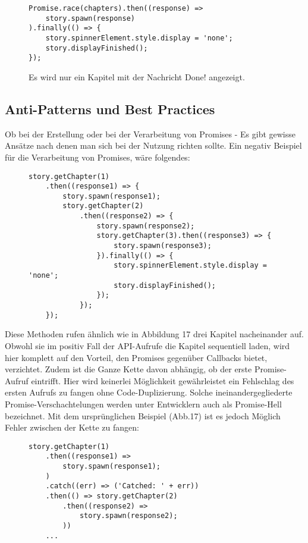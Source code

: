 \begin{figure}[H]
\begin{lstlisting}[basicstyle=\small]
Promise.race(chapters).then((response) =>
    story.spawn(response)
).finally(() => {
    story.spinnerElement.style.display = 'none';
    story.displayFinished();
});
\end{lstlisting}
\caption{Es wird nur ein Kapitel mit der Nachricht \glqq Done!\grqq{} angezeigt.}
\end{figure}

\subsection{Anti-Patterns und Best Practices}

Ob bei der Erstellung oder bei der Verarbeitung von Promises - Es gibt gewisse Ansätze nach denen man sich bei der Nutzung richten sollte. Ein negativ Beispiel für die Verarbeitung von Promises, wäre folgendes:

\begin{figure}[H]
\begin{lstlisting}[basicstyle=\small]
story.getChapter(1)
    .then((response1) => {
        story.spawn(response1);
        story.getChapter(2)
            .then((response2) => {
                story.spawn(response2);
                story.getChapter(3).then((response3) => {
                    story.spawn(response3);
                }).finally(() => {
                    story.spinnerElement.style.display = 'none';
                    story.displayFinished();
                });
            });
    });
\end{lstlisting}
\end{figure}

\noindent
Diese Methoden rufen ähnlich wie in Abbildung 17 drei Kapitel nacheinander auf. Obwohl sie im positiv Fall der API-Aufrufe die Kapitel sequentiell laden, wird hier komplett auf den Vorteil, den Promises gegenüber Callbacks bietet, verzichtet. Zudem ist die Ganze Kette davon abhängig, ob der erste Promise-Aufruf eintrifft. Hier wird keinerlei Möglichkeit gewährleistet ein Fehlschlag des ersten Aufrufs zu fangen ohne Code-Duplizierung. Solche ineinandergegliederte Promise-Verschachtelungen werden unter Entwicklern auch als \glqq{}Promise-Hell\grqq{} bezeichnet.
Mit dem ursprünglichen Beispiel (Abb.17) ist es jedoch Möglich Fehler zwischen der Kette zu fangen:

\begin{figure}[H]
\begin{lstlisting}[basicstyle=\small]
story.getChapter(1)
    .then((response1) =>
        story.spawn(response1);
    )
    .catch((err) => ('Catched: ' + err))
    .then(() => story.getChapter(2)
        .then((response2) => 
            story.spawn(response2);
        ))
    ...
    \end{lstlisting}
\end{figure}

